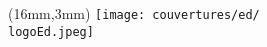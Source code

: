% 
% 
\cleardoublepage

\checkoddpage
\ifoddpage
  \null\newpage
  \thispagestyle{empty}

  \else 
\fi



\pagestyle{empty}

\begin{textblock*}{61mm}(16mm,3mm)
	\noindent\texttt{[image: couvertures/ed/\\logoEd.jpeg]}
\end{textblock*}
\topskip=0pt  %

\vspace*{0em}



